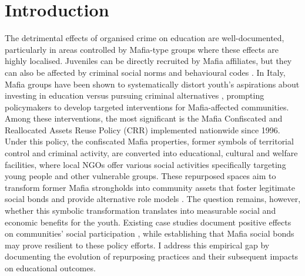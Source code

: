 \documentclass[12pt]{article}
\theoremstyle{plain}
\theoremstyle{plain}
\theoremstyle{plain}
\theoremstyle{definition}
\theoremstyle{plain}
\theoremstyle{definition}
\theoremstyle{plain}
\theoremstyle{remark}
\theoremstyle{definition}
\theoremstyle{definition}
\theoremstyle{plain}
\begin{document}
\section{Introduction}
\label{sec:jmp_intro}


The detrimental effects of organised crime on education are well-documented, particularly in areas controlled by Mafia-type groups where these effects are highly localised. Juveniles can be directly recruited by Mafia affiliates, but they can also be affected by criminal social norms and behavioural codes \citep{van_dijk_children_2019, kleemans_criminal_2008}. In Italy, Mafia groups have been shown to systematically distort youth's aspirations about investing in education versus pursuing criminal alternatives \citep{acemoglu_weak_2020,coniglio_organized_2010, caglayan_organized_2017}, prompting policymakers to develop targeted interventions for Mafia-affected communities. Among these interventions, the most significant is the Mafia Confiscated and Reallocated Assets Reuse Policy (CRR) implemented nationwide since 1996. Under this policy, the confiscated Mafia properties, former symbols of territorial control and criminal activity, are converted into educational, cultural and welfare facilities, where local NGOs offer various social activities specifically targeting young people and other vulnerable groups. These repurposed spaces aim to transform former Mafia strongholds into community assets that foster legitimate social bonds and provide alternative role models \citep{falcone_beneitalia_2016}. The question remains, however, whether this symbolic transformation translates into measurable social and economic benefits for the youth. Existing case studies document positive effects on communities' social participation \citep{nazzaro_il_2021, martone_politiche_2020}, while establishing that Mafia social bonds may prove resilient to these policy efforts. I address this empirical gap by documenting the evolution of repurposing practices and their subsequent impacts on educational outcomes. \par
\medskip
\end{document}
